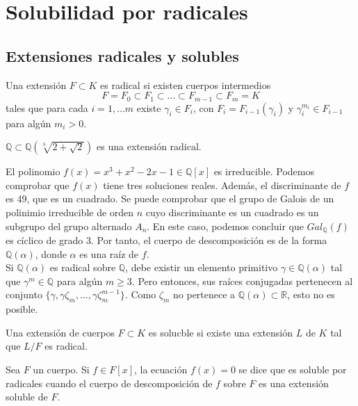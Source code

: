 \chapter{Solubilidad por radicales}
\section{Extensiones radicales y solubles}

\begin{definition}
    Una extensión $F \subset K$ es radical si existen cuerpos intermedios
    $$F = F_0 \subset F_1 \subset \dots \subset F_{m-1} \subset F_m = K$$
    tales que para cada $i = 1, \dots m$ existe $\gamma_i \in F_i$, con $F_i = F_{i-1}(\gamma_i)$ y $\gamma^{m_i}_i \in F_{i-1}$ para algún $m_i > 0$.
\end{definition}

\begin{example}
    $\mathbb{Q} \subset \mathbb{Q}(\sqrt[3]{2+\sqrt{2}})$ es una extensión radical.
\end{example}

\begin{example}
    El polinomio $f(x) = x^3+x^2-2x-1 \in \mathbb{Q}[x]$ es irreducible.
    Podemos comprobar que $f(x)$ tiene tres soluciones reales. Además, el discriminante de $f$ es 49, que es un cuadrado.
    Se puede comprobar que el grupo de Galois de un polinimio irreducible de orden $n$ cuyo discriminante es un cuadrado es un subgrupo del grupo alternado $A_n$.
    En este caso, podemos concluir que $Gal_\mathbb{Q}(f)$ es cíclico de grado 3.
    Por tanto, el cuerpo de descomposición es de la forma $\mathbb{Q}(\alpha)$, donde $\alpha$ es una raíz de $f$.\\
    Si $\mathbb{Q}(\alpha)$ es radical sobre $\mathbb{Q}$, debe existir un elemento primitivo $\gamma \in \mathbb{Q}(\alpha)$ tal que $\gamma^m \in \mathbb{Q}$ para algún $m \geq 3$.
    Pero entonces, sus raíces conjugadas pertenecen al conjunto $\{ \gamma, \gamma\zeta_m, \dots, \gamma\zeta^{m-1}_m \}$.
    Como $\zeta_m$ no pertenece a $\mathbb{Q}(\alpha) \subset \mathbb{R}$, esto no es posible.
\end{example}

\begin{definition}
    Una extensión de cuerpos $F \subset K$ es solucble si existe una extensión $L$ de $K$ tal que $L/F$ es radical.
\end{definition}

\begin{definition}
    Sea $F$ un cuerpo. Si $f \in F[x]$, la ecuación $f(x) = 0$ se dice que es soluble por radicales cuando el cuerpo de descomposición de $f$ sobre $F$ es una extensión soluble de $F$.
\end{definition}

